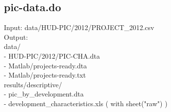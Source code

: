\documentclass[11pt]{article}
\begin{document}
\subsection{pic-data.do}
Input: data/HUD-PIC/2012/PROJECT\_2012.csv \\
Output: \\
data/ \\
- HUD-PIC/2012/PIC-CHA.dta \\
- Matlab/projects-ready.dta \\
- Matlab/projects-ready.txt \\
results/descriptive/ \\
-   pic\_by\_development.dta \\
- development\_characteristics.xls ( with sheet("raw") ) \\



 
\end{document}
